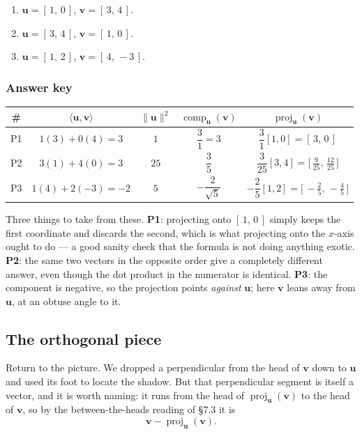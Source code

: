 \documentclass[11pt]{article}
\theoremstyle{definition}
\theoremstyle{remark}
\newcommand{\vc}[1]{\mathbf{#1}}
\newcommand{\norm}[1]{\lVert #1\rVert}
\newcommand{\proj}[2]{\operatorname{proj}_{#1}(#2)}
\newcommand{\comp}[2]{\operatorname{comp}_{#1}(#2)}
\begin{document}
\begin{enumerate}[label=\textbf{P\arabic*.},leftmargin=2.8em,itemsep=6pt,
                  topsep=6pt]
  \item $\vc{u}=[\,1,\,0\,]$, \quad $\vc{v}=[\,3,\,4\,]$.
  \item $\vc{u}=[\,3,\,4\,]$, \quad $\vc{v}=[\,1,\,0\,]$.
  \item $\vc{u}=[\,1,\,2\,]$, \quad $\vc{v}=[\,4,\,-3\,]$.
\end{enumerate}

\subsubsection*{Answer key}
\begin{center}
\renewcommand{\arraystretch}{2.2}   %
\begin{tabular}{@{}c c c c c@{}}
\toprule
\textbf{\#} & $\langle\vc{u},\vc{v}\rangle$ & $\norm{\vc{u}}^{2}$
            & $\comp{\vc{u}}{\vc{v}}$ & $\proj{\vc{u}}{\vc{v}}$ \\
\midrule
P1 & $1(3)+0(4)=3$    & $1$  & $\dfrac{3}{1}=3$
   & $\dfrac{3}{1}[1,0]=[\,3,\,0\,]$ \\
P2 & $3(1)+4(0)=3$    & $25$ & $\dfrac{3}{5}$
   & $\dfrac{3}{25}[3,4]=\bigl[\,\tfrac{9}{25},\,\tfrac{12}{25}\,\bigr]$ \\
P3 & $1(4)+2(-3)=-2$  & $5$  & $-\dfrac{2}{\sqrt5}$
   & $-\dfrac{2}{5}[1,2]=\bigl[\,-\tfrac{2}{5},\,-\tfrac{4}{5}\,\bigr]$ \\
\bottomrule
\end{tabular}
\end{center}

\noindent Three things to take from these. \textbf{P1}: projecting onto
$[\,1,\,0\,]$ simply keeps the first coordinate and discards the second, which
is what projecting onto the $x$-axis ought to do --- a good sanity check that
the formula is not doing anything exotic. \textbf{P2}: the same two vectors in
the opposite order give a completely different answer, even though the dot
product in the numerator is identical. \textbf{P3}: the component is negative,
so the projection points \emph{against} $\vc{u}$; here $\vc{v}$ leans away from
$\vc{u}$, at an obtuse angle to it.

\subsection{The orthogonal piece}
Return to the picture. We dropped a perpendicular from the head of $\vc{v}$ down
to $\vc{u}$ and used its foot to locate the shadow. But that perpendicular
segment is itself a vector, and it is worth naming: it runs from the head of
$\proj{\vc{u}}{\vc{v}}$ to the head of $\vc{v}$, so by the between-the-heads
reading of \S7.3 it is
\[
  \vc{v}-\proj{\vc{u}}{\vc{v}} .
\]
\end{document}
